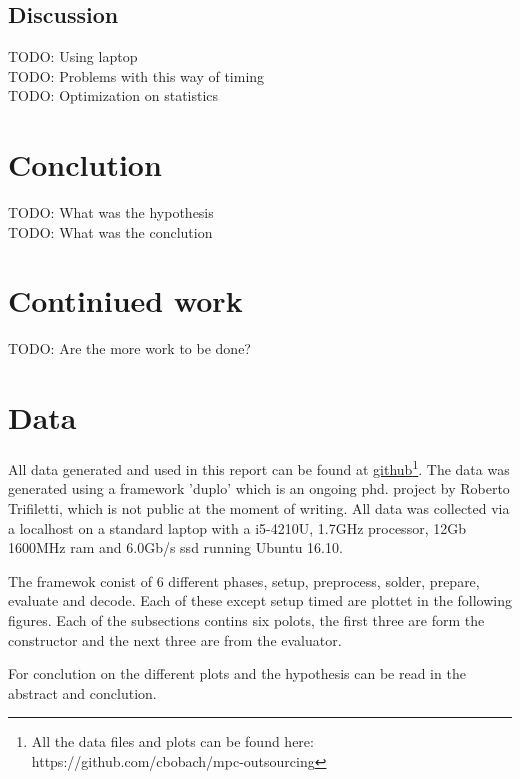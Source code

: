 \documentclass[10pt,a4paper]{article}
\newcommand{\todo}[1]{}
\renewcommand{\todo}[1]{{\color{red} TODO: {#1}} \\}
\begin{document}
\subsection{Discussion}
\todo{Using laptop}
\todo{Problems with this way of timing}
\todo{Optimization on statistics}


\section{Conclution}
\todo{What was the hypothesis}
\todo{What was the conclution}

\section{Continiued work}
\todo{Are the more work to be done?}

\pagebreak




\appendix

\section{Data}
\label{data appendix}
All data generated and used in this report can be found at \href{https://github.com/cbobach/mpc-outsourcing}{github}\footnote{All the data files and plots can be found here: https://github.com/cbobach/mpc-outsourcing}. The data was generated using a framework 'duplo' which is an ongoing phd. project by Roberto Trifiletti, which is not public at the moment of writing. All data was collected via a localhost on a standard laptop with a i5-4210U, 1.7GHz processor, 12Gb 1600MHz ram and 6.0Gb/s ssd running Ubuntu 16.10.

The framewok conist of 6 different phases, setup, preprocess, solder, prepare, evaluate and decode. Each of these except setup timed are plottet in the following figures. Each of the subsections contins six polots, the first three are form the constructor and the next three are from the evaluator.

For conclution on the different plots and the hypothesis can be read in the abstract and conclution.
\end{document}
